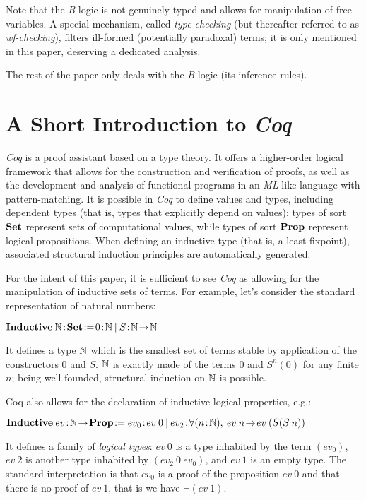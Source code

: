 \documentclass{llncs}
\begin{document}
Note that the \emph{B} logic is not genuinely typed and allows for manipulation of free 
variables. A special mechanism, called \emph{type-checking} (but thereafter referred to as 
\emph{wf-checking}), filters ill-formed (potentially paradoxal) terms; it is only mentioned 
in this paper, deserving a dedicated analysis.

The rest of the paper only deals with the \emph{B} logic (its inference rules).

\section{A Short Introduction to \emph{Coq}}\label{sc_introcoq}

\emph{Coq} is a proof assistant based on a type theory. It offers a higher-order logical 
framework that allows for the construction and verification of proofs, as well as the
development and analysis of functional programs in an \emph{ML}-like language with 
pattern-matching. It is possible in \emph{Coq} to define values and types, including dependent 
types (that is, types that explicitly depend on values); types of sort $\mathbf{Set}$ represent 
sets of computational values, while types of sort $\mathbf{Prop}$ represent logical 
propositions. When defining an inductive type (that is, a least fixpoint), associated 
structural induction principles are automatically generated.

For the intent of this paper, it is sufficient to see \emph{Coq} as allowing for the
manipulation of inductive sets of terms. For example, let's consider the standard 
representation of natural numbers:
\begin{example}\small
$\Bcmd{Inductive}\:\NAT\!:\!\Bcmd{Set}\!:=\!0\!:\!\NAT\:|\:S\!:\!\NAT\!\to\!\NAT$
\end{example}
It defines a type $\mathbb{N}$ which is the smallest set of terms stable by application of the 
constructors $0$ and $S$. $\mathbb{N}$ is exactly made of the terms $0$ and $S^n(0)$ for any finite 
$n$; being well-founded, structural induction on $\mathbb{N}$ is possible.

Coq also allows for the declaration of inductive logical properties, e.g.:
\begin{example}\small
$\Bcmd{Inductive}\:ev\!:\!\NAT\!\to\!\Bcmd{Prop}\!:=
ev_0\!:\!ev\:0\:|\:ev_{2}\!:\!\forall (n\!:\!\NAT),\:ev\:n\!\to\!ev\:(S(S\:n))$
\end{example}
It defines a family of \emph{logical types}: $ev\:0$ is a type inhabited by the term $(ev_0)$, 
$ev\:2$ is another type inhabited by $(ev_{2}\:0\:ev_0)$, and $ev\:1$ is an empty type. The 
standard interpretation is that $ev_0$ is a proof of the proposition $ev\:0$ and that there is 
no proof of $ev\:1$, that is we have $\lnot(ev\:1)$.
\end{document}

